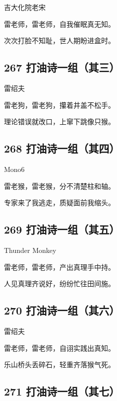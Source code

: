 {吉大化院老宋}

雷老师，雷老师，自我催眠真无知。

次次打脸不知耻，世人期盼进盒时。

\hypertarget{ux6253ux6cb9ux8bd7ux4e00ux7ec4ux5176ux4e09}{%
\subsection{267
打油诗一组（其三）}\label{ux6253ux6cb9ux8bd7ux4e00ux7ec4ux5176ux4e09}}

{雷绍夫}

雷老狗，雷老狗，攥着井盖不松手。

理论错误就改口，上窜下跳像只猴。

\hypertarget{ux6253ux6cb9ux8bd7ux4e00ux7ec4ux5176ux56db}{%
\subsection{268
打油诗一组（其四）}\label{ux6253ux6cb9ux8bd7ux4e00ux7ec4ux5176ux56db}}

{Mono6}

雷老猴，雷老猴，分不清楚柱和轴。

专家来了我逃走，质疑面前我缩头。

\hypertarget{ux6253ux6cb9ux8bd7ux4e00ux7ec4ux5176ux4e94}{%
\subsection{269
打油诗一组（其五）}\label{ux6253ux6cb9ux8bd7ux4e00ux7ec4ux5176ux4e94}}

{Thunder Monkey}

雷老师，雷老师，产出真理手中持。

人见真理齐说好，纷纷忙往田间施。

\hypertarget{ux6253ux6cb9ux8bd7ux4e00ux7ec4ux5176ux516d}{%
\subsection{270
打油诗一组（其六）}\label{ux6253ux6cb9ux8bd7ux4e00ux7ec4ux5176ux516d}}

{雷绍夫}

雷老师，雷老师，自诩实践出真知。

乐山桥头丢碎石，轻重齐落猴气死。

\hypertarget{ux6253ux6cb9ux8bd7ux4e00ux7ec4ux5176ux4e03}{%
\subsection{271
打油诗一组（其七）}\label{ux6253ux6cb9ux8bd7ux4e00ux7ec4ux5176ux4e03}}

